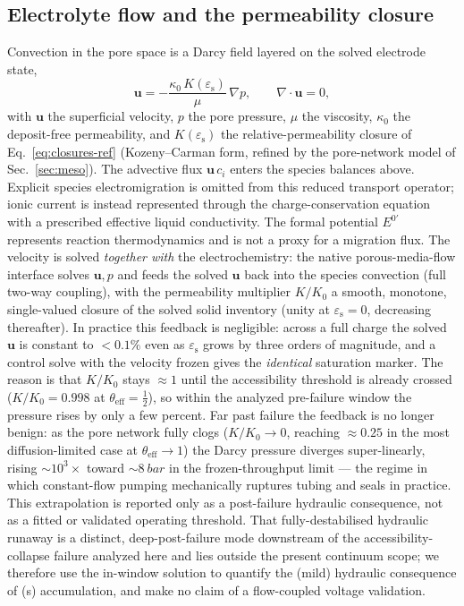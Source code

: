 \documentclass[11pt]{article}
\newcommand{\epss}{\varepsilon_{\mathrm{s}}}
\begin{document}
\subsection{Electrolyte flow and the permeability closure}\label{sec:flow}
Convection in the pore space is a Darcy field layered on the solved electrode state,
\begin{equation}
\mathbf{u}=-\frac{\kappa_0\,K(\epss)}{\mu}\,\nabla p,\qquad \nabla\!\cdot\mathbf{u}=0,
\label{eq:darcy}
\end{equation}
with $\mathbf{u}$ the superficial velocity, $p$ the pore pressure, $\mu$ the viscosity, $\kappa_0$ the
deposit-free permeability, and $K(\epss)$ the relative-permeability closure of Eq.~\eqref{eq:closures-ref}
(Kozeny--Carman form, refined by the pore-network model of Sec.~\ref{sec:meso}). The advective flux
$\mathbf{u}\,c_i$ enters the species balances above. Explicit species electromigration is omitted from this
reduced transport operator; ionic current is instead represented through the charge-conservation equation
with a prescribed effective liquid conductivity. The formal potential $E^{0\prime}$ represents reaction
thermodynamics and is not a proxy for a migration flux. The velocity is solved \emph{together with} the electrochemistry: the native porous-media-flow interface
solves $\mathbf{u},p$ and feeds the solved $\mathbf{u}$ back into the species convection (full two-way
coupling), with the permeability multiplier $K/K_0$ a smooth, monotone, single-valued closure of the solved
solid inventory (unity at $\epss=0$, decreasing thereafter). In practice this feedback is negligible: across
a full charge the solved $\mathbf{u}$ is constant to $<\!0.1\%$ even as $\epss$ grows by three orders of
magnitude, and a control solve with the velocity frozen gives the \emph{identical} saturation marker. The reason
is that $K/K_0$ stays $\approx\!1$ until the accessibility threshold is already crossed ($K/K_0=0.998$ at
$\theta_{\mathrm{eff}}{=}\tfrac12$), so within the analyzed pre-failure window the pressure rises by only a few percent.
Far past failure the feedback is no longer benign: as the pore network fully clogs ($K/K_0\!\to\!0$, reaching
$\approx\!0.25$ in the most diffusion-limited case at $\theta_{\mathrm{eff}}\!\to\!1$) the Darcy pressure diverges
super-linearly, rising $\sim\!10^{3}\times$ toward $\sim\!\SI{8}{bar}$ in the frozen-throughput limit ---
the regime in which constant-flow pumping mechanically ruptures tubing and seals in practice. This
extrapolation is reported only as a post-failure hydraulic consequence, not as a fitted or validated
operating threshold. That fully-destabilised hydraulic runaway is a distinct, deep-post-failure mode downstream of the
accessibility-collapse failure analyzed here and lies outside the present continuum scope; we therefore use
the in-window solution to quantify the (mild) hydraulic consequence of (s) accumulation, and make no
claim of a flow-coupled voltage validation.
\end{document}
